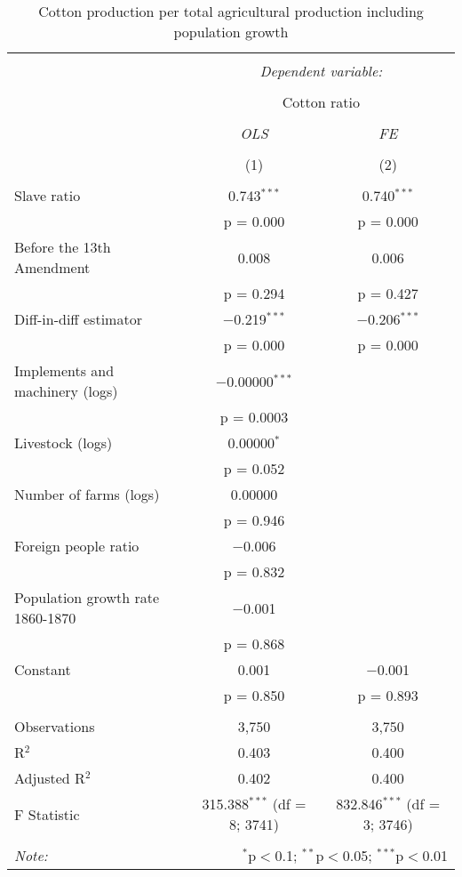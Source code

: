 \documentclass[12pt]{report}
\begin{document}
\begin{table}[!htbp] \centering 
  \caption{Cotton production per total agricultural production including population growth} 
  \label{tab:cot} 
\begin{tabular}{@{\extracolsep{5pt}}lcc} 
\\[-1.8ex]\hline 
\hline \\[-1.8ex] 
 & \multicolumn{2}{c}{\textit{Dependent variable:}} \\ 
\cline{2-3} 
\\[-1.8ex] & \multicolumn{2}{c}{Cotton ratio} \\ 
\\[-1.8ex] & \textit{OLS} & \textit{FE} \\ 
\\[-1.8ex] & (1) & (2)\\ 
\hline \\[-1.8ex] 
 Slave ratio & 0.743$^{***}$ & 0.740$^{***}$ \\ 
  & p = 0.000 & p = 0.000 \\ 
  Before the 13th Amendment & 0.008 & 0.006 \\ 
  & p = 0.294 & p = 0.427 \\ 
  Diff-in-diff estimator & $-$0.219$^{***}$ & $-$0.206$^{***}$ \\ 
  & p = 0.000 & p = 0.000 \\ 
  Implements and machinery (logs) & $-$0.00000$^{***}$ &  \\ 
  & p = 0.0003 &  \\ 
  Livestock (logs) & 0.00000$^{*}$ &  \\ 
  & p = 0.052 &  \\ 
  Number of farms (logs) & 0.00000 &  \\ 
  & p = 0.946 &  \\ 
  Foreign people ratio & $-$0.006 &  \\ 
  & p = 0.832 &  \\ 
  Population growth rate 1860-1870 & $-$0.001 &  \\ 
  & p = 0.868 &  \\ 
  Constant & 0.001 & $-$0.001 \\ 
  & p = 0.850 & p = 0.893 \\ 
 \hline \\[-1.8ex] 
Observations & 3,750 & 3,750 \\ 
R$^{2}$ & 0.403 & 0.400 \\ 
Adjusted R$^{2}$ & 0.402 & 0.400 \\ 
F Statistic & 315.388$^{***}$ (df = 8; 3741) & 832.846$^{***}$ (df = 3; 3746) \\ 
\hline 
\hline \\[-1.8ex] 
\textit{Note:}  & \multicolumn{2}{r}{$^{*}$p$<$0.1; $^{**}$p$<$0.05; $^{***}$p$<$0.01} \\ 
\end{tabular} 
\end{table} 
\end{document}
